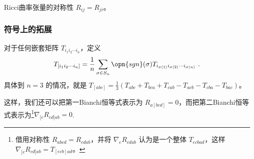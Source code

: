 \begin{theorem}{Ricci曲率张量的对称性}
$R_{ij}=R_{ji}$。
\end{theorem}

\subsubsection{符号上的拓展}

对于任何嵌套矩阵 $T_{i_1i_2\cdots i_n}$，定义
\begin{equation}
T_{[i_1i_2\cdots i_n]}=\frac{1}{n}\sum\limits_{\sigma\in S_n}\opn{sgn}(\sigma)T_{i_{\sigma(1)}i_{\sigma(2)}\cdots i_{\sigma(n)}}~.
\end{equation}
具体到 $n=3$ 的情况，就是 $T_{[abc]}=\frac{1}{3}(T_{abc}+T_{bca}+T_{cab}-T_{acb}-T_{cba}-T_{bac})$。





这样，我们还可以把第一Bianchi恒等式表示为 $R_{a[bcd]}=0$，而把第二Bianchi恒等式表示为\footnote{借用对称性 $R_{abcd}=R_{cdab}$，并将 $\nabla_eR_{cdab}$ 认为是一个整体 $T_{ecbad}$，这样 $\nabla_{[e}R_{cd]ab}=T_{[ecb]ad}$。}$\nabla_{[e}R_{cd]ab}=0$.








